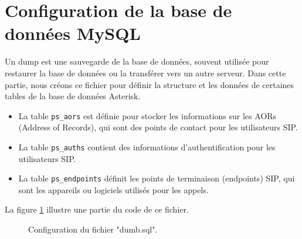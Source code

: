 \section{Configuration de la base de données MySQL}
Un dump est une sauvegarde de la base de données, souvent utilisée pour restaurer la base de données ou la transférer vers un autre serveur. Dans cette partie, nous créons ce fichier pour définir la structure et les données de certaines tables de la base de données Asterisk. 
\begin{itemize}
    \item La table \texttt{ps\_aors} est définie pour stocker les informations sur les AORs (Address of Records), qui sont des points de contact pour les utilisateurs SIP.
    \item La table \texttt{ps\_auths} contient des informations d'authentification pour les utilisateurs SIP.
    \item La table \texttt{ps\_endpoints} définit les points de terminaison (endpoints) SIP, qui sont les appareils ou logiciels utilisés pour les appels.
\end{itemize}
La figure \ref{fig:dumb} illustre une partie du code de ce fichier.
   \begin{figure}[H]
        \centering
        \caption{Configuration du fichier "dumb.sql".}
        \label{fig:dumb}
    \end{figure}

